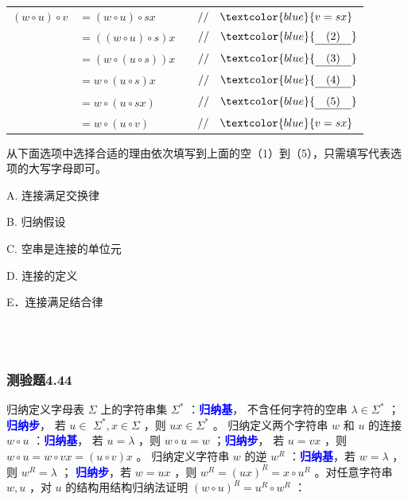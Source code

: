\documentclass[UTF8, heading=true]{ctexart}
\begin{document}
\begin{table}[H]
  \renewcommand{\arraystretch}{1.5}
  \centering
\begin{tabular}{rlrl}
  $(w \circ u) \circ v$ & $=(w \circ u) \circ s x$ & & $/ / \quad \textcolor{blue}{v = s x}$ \\
  & $=((w \circ u) \circ s) x$ & & $/ / \quad \textcolor{blue}{\underline{\quad (2) \quad}}$ \\
  & $=(w \circ(u \circ s)) x$ & & $/ / \quad  \textcolor{blue}{\underline{\quad (3) \quad}}$ \\
  & $=w \circ(u \circ s) x$ & & $/ / \quad \textcolor{blue}{\underline{\quad (4) \quad}}$ \\
  & $=w \circ(u \circ s x)$ & & $/ / \quad \textcolor{blue}{\underline{\quad (5) \quad}}$ \\
  & $=w \circ(u \circ v)$ & & $ / / \quad \textcolor{blue}{v = s x}$
\end{tabular}
\end{table}

从下面选项中选择合适的理由依次填写到上面的空（1）到（5），只需填写代表选项的大写字母即可。

A. 连接满足交换律

B. 归纳假设

C. 空串是连接的单位元

D.  连接的定义

E．连接满足结合律

\textcolor{white}{答案：（1）C；c；空串是连接的单位元
（2）D；d；连接的定义
（3）B；b；归纳假设
（4）D；d；连接的定义
（5）D；d；连接的定义}

\subsubsection{测验题4.44}

归纳定义字母表 $\Sigma$ 上的字符串集 $\Sigma^*$ ：\textcolor{blue}{\textbf{归纳基}}，
不含任何字符的空串 $\lambda \in \Sigma^*$ ；\textcolor{blue}{\textbf{归纳步}}，
若 $u \in$ $\Sigma^*, x \in \Sigma$ ，则 $u x \in \Sigma^*$ 。
归纳定义两个字符串 $w$ 和 $u$ 的连接 $w \circ u$ ：\textcolor{blue}{\textbf{归纳基}}，
若 $u=\lambda$ ，则 $w \circ u=w$ ；\textcolor{blue}{\textbf{归纳步}}，
若 $u=v x$ ，则 $w \circ u=w \circ v x=(u \circ v) x$ 。
归纳定义字符串 $w$ 的逆 $w^R$ ：\textcolor{blue}{\textbf{归纳基}}，若 $w=\lambda$ ，则 $w^R=\lambda$ ；
\textcolor{blue}{\textbf{归纳步}}，若 $w=u x$ ，则 $w^R=(u x)^R=x \circ u^R$ 。对任意字符串 $w, u$ ，对 $u$ 的结构用结构归纳法证明 $(w \circ u)^R=u^R \circ w^R$ ：
\end{document}
